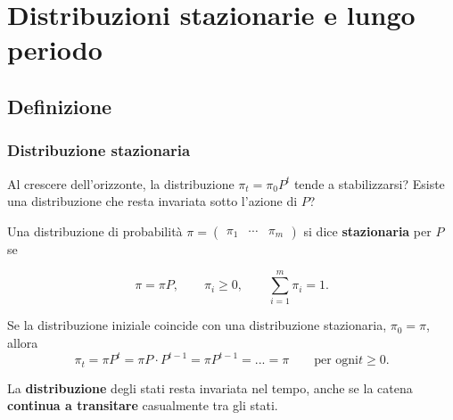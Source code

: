 

\section{Distribuzioni stazionarie e lungo periodo}

\subsection{Definizione}%

\begin{frame}%
%

\frametitle{Distribuzione stazionaria}%
%

%


Al crescere dell'orizzonte, la distribuzione $\pi_{t}=\pi_{0}P^{t}$ tende a
stabilizzarsi? Esiste una distribuzione che resta invariata sotto l'azione di
$P$?

\medskip

Una distribuzione di probabilit\`{a} $\pi=
\begin{pmatrix}
\pi_{1} & \cdots & \pi_{m}%
\end{pmatrix}
$ si dice \textbf{stazionaria} per $P$ se%

\[
\pi=\pi P, \qquad\pi_{i}\geq0, \qquad\sum_{i=1}^{m}\pi_{i}=1.
\]


\medskip

\begin{stepitemize}
\item Se la distribuzione iniziale coincide con una distribuzione stazionaria,
$\pi_{0}=\pi$, allora
\[
\pi_{t}=\pi P^{t}=\pi P\cdot P^{t-1}=\pi P^{t-1}=...=\pi\qquad\text{per ogni
}t\geq0.
\]


\item La \textbf{distribuzione} degli stati resta invariata nel tempo, anche
se la catena \textbf{continua a transitare} casualmente tra gli stati.
\end{stepitemize}

%

\transboxout
\end{frame}%


